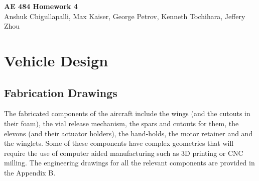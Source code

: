 




\begin{center}
    {\Large\textbf{AE 484 Homework 4}}\\
    Anshuk Chigullapalli, Max Kaiser, George Petrov, Kenneth Tochihara, Jeffery Zhou\\
\end{center}

\section{Vehicle Design}

    \subsection{Fabrication Drawings}
    
        The fabricated components of the aircraft include the  wings (and the cutouts in their foam), the vial release mechanism, the spars and cutouts for them, the elevons (and their actuator holders), the hand-holds, the motor retainer and and the winglets. Some of these components have complex geometries that will require the use of computer aided manufacturing such as 3D printing or CNC milling. The engineering drawings for all the relevant components are provided in the Appendix B.
    
